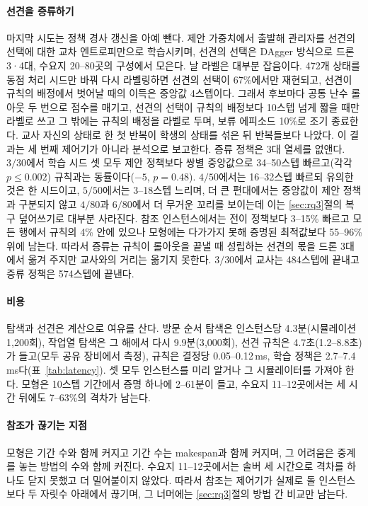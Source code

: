 \documentclass[final,5p,times,twocolumn]{elsarticle}
\begin{document}
\paragraph{선견을 증류하기}
마지막 시도는 정책 경사 갱신을 아예 뺀다. 제안 가중치에서 출발해 관리자를 선견의 선택에 대한 교차
엔트로피만으로 학습시키며, 선견의 선택은 DAgger \cite{ross2011} 방식으로 드론 3·4대, 수요지
20--80곳의 구성에서 모은다. 날 라벨은 대부분 잡음이다. 472개 상태를 동점 처리 시드만 바꿔 다시
라벨링하면 선견의 선택이 67\%에서만 재현되고, 선견이 규칙의 배정에서 벗어날 때의 이득은 중앙값 4스텝이다.
그래서 후보마다 공통 난수 롤아웃 두 번으로 점수를 매기고, 선견의 선택이 규칙의 배정보다 10스텝 넘게
짧을 때만 라벨로 쓰고 그 밖에는 규칙의 배정을 라벨로 두며, 보류 에피소드 10\%로 조기 종료한다. 교사
자신의 상태로 한 첫 반복이 학생의 상태를 섞은 뒤 반복들보다 나았다. 이 결과는 세 번째 제어기가 아니라
분석으로 보고한다. 증류 정책은 3대 열세를 없앤다. $3/30$에서 학습 시드 셋 모두 제안 정책보다 쌍별
중앙값으로 34--50스텝 빠르고(각각 $p \le 0.002$) 규칙과는 동률이다($-5$, $p = 0.48$). $4/50$에서는
16--32스텝 빠르되 유의한 것은 한 시드이고, $5/50$에서는 3--18스텝 느리며, 더 큰 편대에서는 중앙값이
제안 정책과 구분되지 않고 $4/80$과 $6/80$에서 더 무거운 꼬리를 보이는데 이는 \ref{sec:rq3}절의 복구
덮어쓰기로 대부분 사라진다. 참조 인스턴스에서는 전이 정책보다 3--15\% 빠르고 모든 행에서 규칙의 4\%
안에 있으나 모형에는 다가가지 못해 증명된 최적값보다 55--96\% 위에 남는다. 따라서 증류는 규칙이
롤아웃을 끝낼 때 성립하는 선견의 몫을 드론 3대에서 옮겨 주지만 교사와의 거리는 옮기지 못한다. $3/30$에서
교사는 484스텝에 끝내고 증류 정책은 574스텝에 끝낸다.



\paragraph{비용}
탐색과 선견은 계산으로 여유를 산다. 방문 순서 탐색은 인스턴스당 4.3분(시뮬레이션 1{,}200회), 작업열 탐색은
그 해에서 다시 9.9분(3{,}000회), 선견 규칙은 4.7초(1.2--8.8초)가 들고(모두 공유 장비에서 측정), 규칙은 결정당 0.05--0.12\,ms, 학습 정책은
2.7--7.4\,ms다(표~\ref{tab:latency}). 셋 모두 인스턴스를 미리 알거나 그 시뮬레이터를 가져야 한다.
모형은 10스텝 기간에서 증명 하나에 2--61분이 들고, 수요지 11--12곳에서는 세 시간 뒤에도 7--63\%의
격차가 남는다.

\paragraph{참조가 끊기는 지점}
모형은 기간 수와 함께 커지고 기간 수는 makespan과 함께 커지며, 그 어려움은 중계를 놓는 방법의 수와 함께
커진다. 수요지 11--12곳에서는 솔버 세 시간으로 격차를 하나도 닫지 못했고 더 밀어붙이지 않았다. 따라서
참조는 제어기가 실제로 돌 인스턴스보다 두 자릿수 아래에서 끊기며, 그 너머에는 \ref{sec:rq3}절의 방법 간
비교만 남는다.
\end{document}
